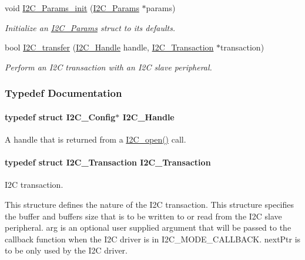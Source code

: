 \begin{DoxyCompactItemize}
void \hyperlink{_i2_c_8h_ab11636302074d67180207ab81ceb323c}{I2\+C\+\_\+\+Params\+\_\+init} (\hyperlink{struct_i2_c___params}{I2\+C\+\_\+\+Params} $\ast$params)
\begin{DoxyCompactList}\small\item\em Initialize an \hyperlink{struct_i2_c___params}{I2\+C\+\_\+\+Params} struct to its defaults. \end{DoxyCompactList}\item 
bool \hyperlink{_i2_c_8h_ac5d827b67fe77d7d179026941cc069d7}{I2\+C\+\_\+transfer} (\hyperlink{_i2_c_8h_a5809a229f8395c87f59e63128195c1bf}{I2\+C\+\_\+\+Handle} handle, \hyperlink{struct_i2_c___transaction}{I2\+C\+\_\+\+Transaction} $\ast$transaction)
\begin{DoxyCompactList}\small\item\em Perform an I2\+C transaction with an I2\+C slave peripheral. \end{DoxyCompactList}\end{DoxyCompactItemize}


\subsubsection{Typedef Documentation}
\paragraph[{I2\+C\+\_\+\+Handle}]{\setlength{\rightskip}{0pt plus 5cm}typedef struct {\bf I2\+C\+\_\+\+Config}$\ast$ {\bf I2\+C\+\_\+\+Handle}}\label{_i2_c_8h_a5809a229f8395c87f59e63128195c1bf}


A handle that is returned from a \hyperlink{_i2_c_8h_ae1aa99e1fee4517406018e10025cca0e}{I2\+C\+\_\+open()} call. 

\paragraph[{I2\+C\+\_\+\+Transaction}]{\setlength{\rightskip}{0pt plus 5cm}typedef struct {\bf I2\+C\+\_\+\+Transaction}  {\bf I2\+C\+\_\+\+Transaction}}\label{_i2_c_8h_a54d2d506a10628451340a2901bdb6277}


I2\+C transaction. 

This structure defines the nature of the I2\+C transaction. This structure specifies the buffer and buffer\textquotesingle{}s size that is to be written to or read from the I2\+C slave peripheral. arg is an optional user supplied argument that will be passed to the callback function when the I2\+C driver is in I2\+C\+\_\+\+M\+O\+D\+E\+\_\+\+C\+A\+L\+L\+B\+A\+C\+K. next\+Ptr is to be only used by the I2\+C driver. 
